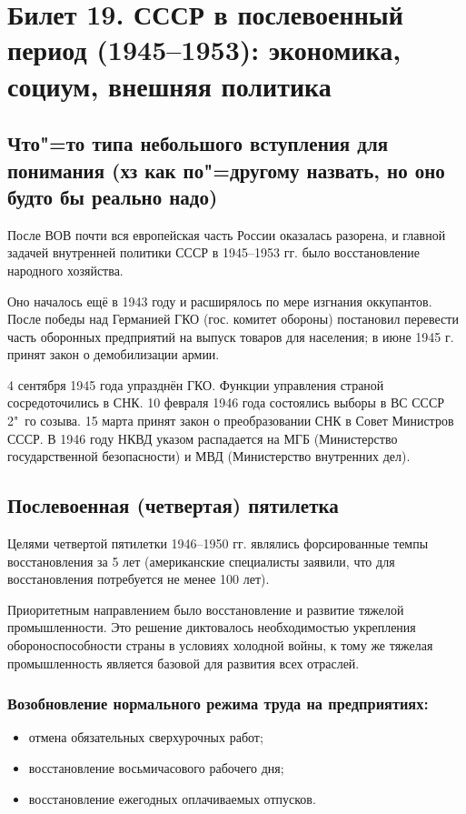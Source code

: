 \section{Билет 19. СССР в послевоенный период (1945--1953): экономика, социум, внешняя политика}

\subsection{Что"=то типа небольшого вступления для понимания (хз как по"=другому назвать, но оно будто бы реально надо)}

После ВОВ почти вся европейская часть России оказалась разорена, и главной задачей внутренней политики СССР в 1945--1953 гг. было восстановление народного хозяйства.

Оно началось ещё в 1943 году и расширялось по мере изгнания оккупантов. После победы над Германией ГКО (гос. комитет обороны) постановил перевести часть оборонных предприятий на выпуск товаров для населения; в июне 1945 г. принят закон о демобилизации армии.

4 сентября 1945 года упразднён ГКО. Функции управления страной сосредоточились в СНК. 10 февраля 1946 года состоялись выборы в ВС СССР 2"~го созыва. 15 марта принят закон о преобразовании СНК в Совет Министров СССР. В 1946 году НКВД указом распадается на МГБ (Министерство государственной безопасности) и МВД (Министерство внутренних дел). 

\subsection{Послевоенная (четвертая) пятилетка}

Целями четвертой пятилетки 1946--1950 гг. являлись форсированные темпы восстановления за 5 лет (американские специалисты заявили, что для восстановления потребуется не менее 100 лет). 

Приоритетным направлением было восстановление и развитие тяжелой промышленности. Это решение диктовалось необходимостью укрепления обороноспособности страны в условиях холодной войны, к тому же тяжелая промышленность является базовой для развития всех отраслей. 

\subsubsection{\textbf{Возобновление нормального режима труда на предприятиях:}}

\begin{itemize}
    \item отмена обязательных сверхурочных работ;
    \item восстановление восьмичасового рабочего дня;
    \item восстановление ежегодных оплачиваемых отпусков.
\end{itemize}

